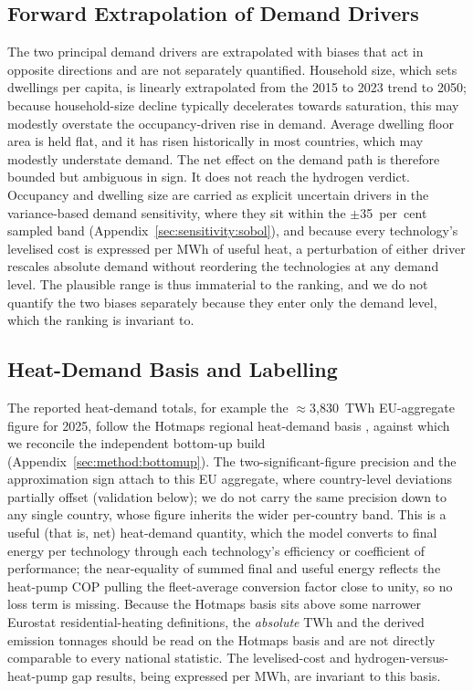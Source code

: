 \subsection{Forward Extrapolation of Demand Drivers}
The two principal demand drivers are extrapolated with biases that act in
opposite directions and are not separately quantified. Household size, which
sets dwellings per capita, is linearly extrapolated from the 2015 to 2023 trend
to 2050; because household-size decline typically decelerates towards
saturation, this may modestly overstate the occupancy-driven rise in demand.
Average dwelling floor area is held flat, and it has risen historically in most countries, which may modestly understate demand. The net
effect on the demand path is therefore bounded but ambiguous in sign. It does not
reach the hydrogen verdict. Occupancy and dwelling size are carried as explicit
uncertain drivers in the variance-based demand sensitivity, where they sit within
the $\pm$35~per~cent sampled band (Appendix~\ref{sec:sensitivity:sobol}), and
because every technology's levelised cost is expressed per MWh of useful heat, a
perturbation of either driver rescales absolute demand without reordering the
technologies at any demand level. The plausible range is thus immaterial to
the ranking, and we do not quantify the two biases separately because they enter
only the demand level, which the ranking is invariant to.

\subsection{Heat-Demand Basis and Labelling}
The reported heat-demand totals, for example the $\approx$3{,}830~TWh
EU-aggregate figure for 2025, follow the Hotmaps regional heat-demand basis
\citep{Hotmaps2020}, against which we reconcile the independent bottom-up build
(Appendix~\ref{sec:method:bottomup}). The two-significant-figure precision and the
approximation sign attach to this EU aggregate, where country-level deviations
partially offset (validation below); we do not carry the same precision down to
any single country, whose figure inherits the wider per-country band. This is a
useful (that is, net) heat-demand quantity, which the model converts to final
energy per technology through each
technology's efficiency or coefficient of performance; the near-equality of summed final and useful energy reflects the heat-pump COP pulling
the fleet-average conversion factor close to unity, so no loss term is missing. Because
the Hotmaps basis sits above some narrower Eurostat residential-heating
definitions, the \emph{absolute} TWh and the derived emission tonnages should be
read on the Hotmaps basis and are not directly comparable to every national
statistic. The levelised-cost and hydrogen-versus-heat-pump gap results, being
expressed per MWh, are invariant to this basis.

